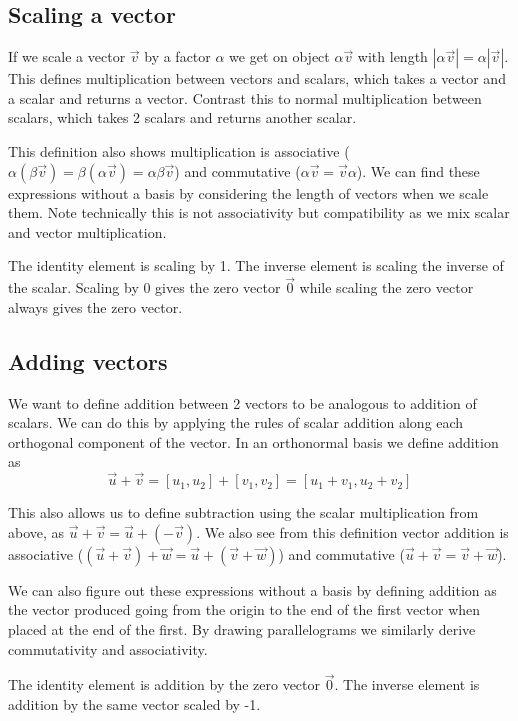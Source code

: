 \documentclass[options]{report}
\def \u{\vec{u}}
\def \v{\vec{v}}
\def \w{\vec{w}}
\begin{document}
\subsection{Scaling a vector}
If we scale a vector $\v$ by a factor $\alpha$ we get on object $\alpha \v$ with length $|\alpha \v| = \alpha |\v|$. This defines multiplication between vectors and scalars, which takes a vector and a scalar and returns a vector. Contrast this to normal multiplication between scalars, which takes 2 scalars and returns another scalar.

This definition also shows multiplication is associative ($\alpha (\beta \v) = \beta (\alpha \v) = \alpha \beta \v$) and commutative ($ \alpha \v = \v \alpha$). We can find these expressions without a basis by considering the length of vectors when we scale them. Note technically this is not associativity but compatibility as we mix scalar and vector multiplication.

The identity element is scaling by 1. The inverse element is scaling the inverse of the scalar. Scaling by 0 gives the zero vector $\vec{0}$ while scaling the zero vector always gives the zero vector.

\subsection{Adding vectors}
We want to define addition between 2 vectors to be analogous to addition of scalars. We can do this by applying the rules of scalar addition along each orthogonal component of the vector. In an orthonormal basis we define addition as
\begin{equation}
	\u + \v = [u_1, u_2] + [v_1, v_2] = [u_1 + v_1, u_2 + v_2]
\end{equation}

This also allows us to define subtraction using the scalar multiplication from above, as $\u + \v = \u + (-\v)$. We also see from this definition vector addition is associative ($(\u + \v) + \w = \u + (\v + \w)$) and commutative ($\u + \v = \v + \w$).

We can also figure out these expressions without a basis by defining addition as the vector produced going from the origin to the end of the first vector when placed at the end of the first. By drawing parallelograms we similarly derive commutativity and associativity.

The identity element is addition by the zero vector $\vec{0}$. The inverse element is addition by the same vector scaled by -1.
\end{document}

